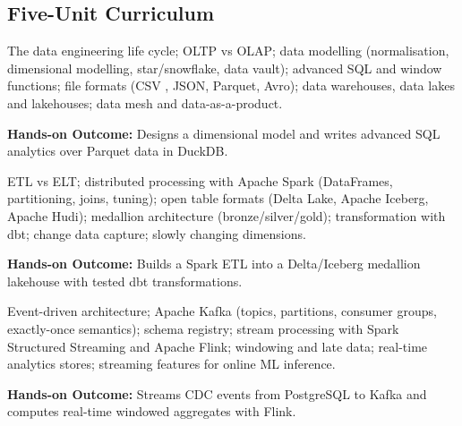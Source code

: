 \documentclass[10pt,a4paper]{article}
\begin{document}
\subsection*{Five-Unit Curriculum}
\begin{tcolorbox}[unitbox,title={{\color{gold}UNIT I}\quad Data Engineering Foundations\hfill{\color{gold}9 Hours}}]\small The data engineering life cycle; OLTP vs OLAP; data modelling (normalisation, dimensional modelling, star/snowflake, data vault); advanced SQL and window functions; file formats (CSV , JSON, Parquet, Avro); data warehouses, data lakes and lakehouses; data mesh and data-as-a-product.\par\vspace{2pt}\par\textbf{Hands-on Outcome:} Designs a dimensional model and writes advanced SQL analytics over Parquet data in DuckDB.\end{tcolorbox}
\begin{tcolorbox}[unitbox,title={{\color{gold}UNIT II}\quad Batch Processing and Lakehouse Platforms\hfill{\color{gold}9 Hours}}]\small ETL vs ELT; distributed processing with Apache Spark (DataFrames, partitioning, joins, tuning); open table formats (Delta Lake, Apache Iceberg, Apache Hudi); medallion architecture (bronze/silver/gold); transformation with dbt; change data capture; slowly changing dimensions.\par\vspace{2pt}\par\textbf{Hands-on Outcome:} Builds a Spark ETL into a Delta/Iceberg medallion lakehouse with tested dbt transformations.\end{tcolorbox}
\begin{tcolorbox}[unitbox,title={{\color{gold}UNIT III}\quad Streaming and Real-Time Data\hfill{\color{gold}9 Hours}}]\small Event-driven architecture; Apache Kafka (topics, partitions, consumer groups, exactly-once semantics); schema registry; stream processing with Spark Structured Streaming and Apache Flink; windowing and late data; real-time analytics stores; streaming features for online ML inference.\par\vspace{2pt}\par\textbf{Hands-on Outcome:} Streams CDC events from PostgreSQL to Kafka and computes real-time windowed aggregates with Flink.\end{tcolorbox}
\end{document}
